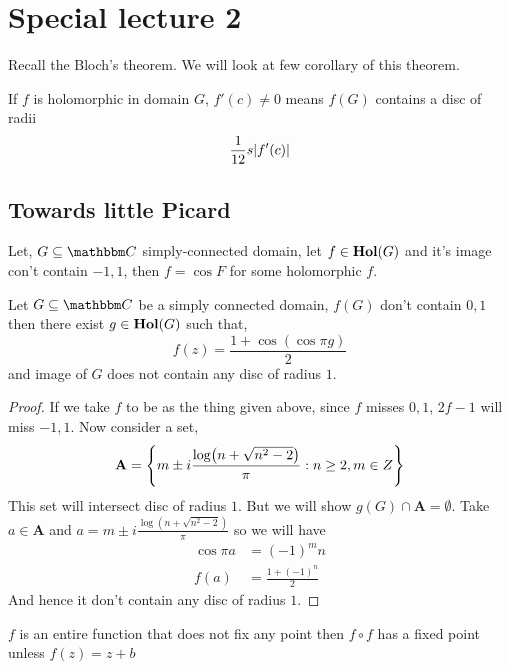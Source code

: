 \documentclass[../ComplexAnalysis_Notes.tex]{subfiles}
\begin{document}
\chapter*{Special lecture 2} %
\setcounter{chapter}{14} %
\setcounter{section}{0}
\setcounter{equation}{0}
\setcounter{figure}{0}

Recall the Bloch's theorem. We will look at few corollary of this theorem.

\begin{corollary}
    If $f$ is holomorphic in domain $G$, $f'(c)\neq 0$ means $f(G)$ contains a disc of radii $$\frac{1}{12}s\abs{f'(c)}$$
\end{corollary}

\section*{Towards little Picard}

\begin{Lem}{}{}
    Let, $G \subseteq \C$ simply-connected domain, let $f \in \operatorname{\mathbf{Hol}}(G)$ and it's image con't contain $-1,1$, then $f = \cos F$ for some holomorphic $f$.
\end{Lem}

\begin{proposition}
    Let $G \subseteq \C$ be a simply connected domain, $f(G)$ don't contain $0,1$ then there exist $g \in \operatorname{\mathbf{Hol}}(G)$ such that, $$f(z)= \frac{1+\cos(\cos \pi g)}{2}$$ and image of $G$ does not contain any disc of radius $1$.
\end{proposition}

\begin{proof}
    If we take $f$ to be as the thing given above, since $f$ misses $0,1$, $2f-1$ will miss $-1,1$. Now consider a set, $$\mathbf{A} = \qty{m \pm i \frac{\log (n + \sqrt{n^2-2})}{\pi} : n \geq 2, m \in Z}$$ This set will intersect disc of radius $1$. But we will show $g(G) \cap \mathbf{A}= \emptyset$. Take $a \in \mathbf{A}$ and $a = m \pm i \frac{\log (n + \sqrt{n^2-2})}{\pi}$ so we will have \begin{align*}
        \cos \pi a & = (-1)^m n           \\
        f(a)       & = \frac{1+(-1)^n}{2}
    \end{align*} And hence it don't contain any disc of radius $1$.
\end{proof}

\begin{corollary}
    $f$ is an entire function that does not fix any point then $f \circ f$ has a fixed point unless $f(z)=z+b$
\end{corollary}
\end{document}
